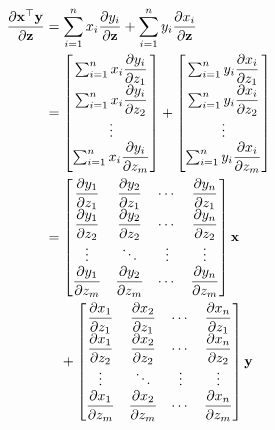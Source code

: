 \documentclass{article}
\newcommand{\trans}{\top}
\begin{document}
\begin{align}
    \dfrac{\partial \mathbf{x}^\trans \mathbf{y}}{\partial \mathbf{z}} & = \sum_{i=1}^{n} x_i\dfrac{\partial y_i}{\partial \mathbf{z}} + \sum_{i=1}^{n} y_i\dfrac{\partial x_i}{\partial \mathbf{z}} \\
    & = \begin{bmatrix}
        \sum_{i=1}^{n} x_i\dfrac{\partial y_i}{\partial z_1} \\
        \sum_{i=1}^{n} x_i\dfrac{\partial y_i}{\partial z_2} \\
        \vdots \\
        \sum_{i=1}^{n} x_i\dfrac{\partial y_i}{\partial z_m} \\
    \end{bmatrix} +
    \begin{bmatrix}
        \sum_{i=1}^{n} y_i\dfrac{\partial x_i}{\partial z_1} \\
        \sum_{i=1}^{n} y_i\dfrac{\partial x_i}{\partial z_2} \\
        \vdots \\
        \sum_{i=1}^{n} y_i\dfrac{\partial x_i}{\partial z_m}
    \end{bmatrix} \\
    & = \begin{bmatrix}
        \dfrac{\partial y_1}{\partial z_1} & \dfrac{\partial y_2}{\partial z_1} & \cdots & \dfrac{\partial y_n}{\partial z_1} \\
        \dfrac{\partial y_1}{\partial z_2} & \dfrac{\partial y_2}{\partial z_2} & \cdots & \dfrac{\partial y_n}{\partial z_2} \\
        \vdots & \ddots & \vdots & \vdots \\
        \dfrac{\partial y_1}{\partial z_m} & \dfrac{\partial y_2}{\partial z_m} & \cdots & \dfrac{\partial y_n}{\partial z_m} \\
    \end{bmatrix} \mathbf{x} \\
    & \hspace{2.5ex} + \begin{bmatrix}
        \dfrac{\partial x_1}{\partial z_1} & \dfrac{\partial x_2}{\partial z_1} & \cdots & \dfrac{\partial x_n}{\partial z_1} \\
        \dfrac{\partial x_1}{\partial z_2} & \dfrac{\partial x_2}{\partial z_2} & \cdots & \dfrac{\partial x_n}{\partial z_2} \\
        \vdots & \ddots & \vdots & \vdots \\
        \dfrac{\partial x_1}{\partial z_m} & \dfrac{\partial x_2}{\partial z_m} & \cdots & \dfrac{\partial x_n}{\partial z_m} \\
    \end{bmatrix} \mathbf{y}
\end{align}
\end{document}
